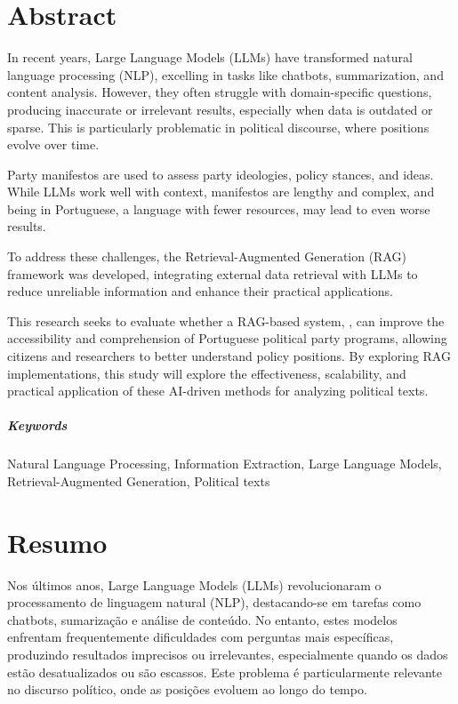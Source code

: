 \chapter*{Abstract}

In recent years, Large Language Models (LLMs) have transformed natural language processing (NLP), excelling in tasks like chatbots, summarization, and content analysis. However, they often struggle with domain-specific questions, producing inaccurate or irrelevant results, especially when data is outdated or sparse. This is particularly problematic in political discourse, where positions evolve over time.

Party manifestos are used to assess party ideologies, policy stances, and ideas. While LLMs work well with context, manifestos are lengthy and complex, and being in Portuguese, a language with fewer resources, may lead to even worse results.

To address these challenges, the Retrieval-Augmented Generation (RAG) framework was developed, integrating external data retrieval with LLMs to reduce unreliable information and enhance their practical applications.

This research seeks to evaluate whether a RAG-based system, \sysname{}, can improve the accessibility and comprehension of Portuguese political party programs, allowing citizens and researchers to better understand policy positions. By exploring RAG implementations, this study will explore the effectiveness, scalability, and practical application of these AI-driven methods for analyzing political texts.

\paragraph{Keywords} Natural Language Processing, Information Extraction, Large Language Models, Retrieval-Augmented Generation, Political texts

\cleardoublepage

\chapter*{Resumo}

Nos últimos anos, Large Language Models (LLMs) revolucionaram o processamento de linguagem natural (NLP), destacando-se em tarefas como chatbots, sumarização e análise de conteúdo. No entanto, estes modelos enfrentam frequentemente dificuldades com perguntas mais específicas, produzindo resultados imprecisos ou irrelevantes, especialmente quando os dados estão desatualizados ou são escassos. Este problema é particularmente relevante no discurso político, onde as posições evoluem ao longo do tempo.

